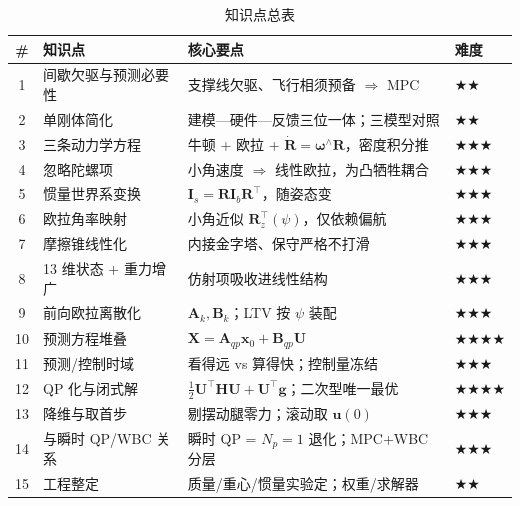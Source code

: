 \begin{table}[H]\centering\small
\caption{知识点总表}
\begin{tabular}{clll}
\toprule
\# & 知识点 & 核心要点 & 难度 \\
\midrule
1 & 间歇欠驱与预测必要性 & 支撑线欠驱、飞行相须预备 $\Rightarrow$ MPC & \(\bigstar\bigstar\) \\
2 & 单刚体简化 & 建模—硬件—反馈三位一体；三模型对照 & \(\bigstar\bigstar\) \\
3 & 三条动力学方程 & 牛顿 + 欧拉 + $\dot{\mathbf{R}}=\boldsymbol{\omega}^\wedge\mathbf{R}$，密度积分推 & \(\bigstar\bigstar\bigstar\) \\
4 & 忽略陀螺项 & 小角速度 $\Rightarrow$ 线性欧拉，为凸牺牲耦合 & \(\bigstar\bigstar\bigstar\) \\
5 & 惯量世界系变换 & $\mathbf{I}_s=\mathbf{R}\mathbf{I}_b\mathbf{R}^\top$，随姿态变 & \(\bigstar\bigstar\bigstar\) \\
6 & 欧拉角率映射 & 小角近似 $\mathbf{R}_z^\top(\psi)$，仅依赖偏航 & \(\bigstar\bigstar\bigstar\) \\
7 & 摩擦锥线性化 & 内接金字塔、保守严格不打滑 & \(\bigstar\bigstar\bigstar\) \\
8 & 13 维状态 + 重力增广 & 仿射项吸收进线性结构 & \(\bigstar\bigstar\bigstar\) \\
9 & 前向欧拉离散化 & $\mathbf{A}_k,\mathbf{B}_k$；LTV 按 $\psi$ 装配 & \(\bigstar\bigstar\bigstar\) \\
10 & 预测方程堆叠 & $\mathbf{X}=\mathbf{A}_{qp}\boldsymbol{x}_0+\mathbf{B}_{qp}\mathbf{U}$ & \(\bigstar\bigstar\bigstar\bigstar\) \\
11 & 预测/控制时域 & 看得远 vs 算得快；控制量冻结 & \(\bigstar\bigstar\bigstar\) \\
12 & QP 化与闭式解 & $\tfrac12\mathbf{U}^\top\mathbf{H}\mathbf{U}+\mathbf{U}^\top\mathbf{g}$；二次型唯一最优 & \(\bigstar\bigstar\bigstar\bigstar\) \\
13 & 降维与取首步 & 剔摆动腿零力；滚动取 $\boldsymbol{u}(0)$ & \(\bigstar\bigstar\bigstar\) \\
14 & 与瞬时 QP/WBC 关系 & 瞬时 QP = $N_p{=}1$ 退化；MPC+WBC 分层 & \(\bigstar\bigstar\bigstar\) \\
15 & 工程整定 & 质量/重心/惯量实验定；权重/求解器 & \(\bigstar\bigstar\) \\
\bottomrule
\end{tabular}
\end{table}

